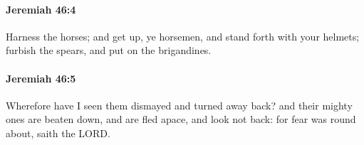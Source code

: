 		\paragraph{Jeremiah 46:4} %
			\label{JEREMIAH-46-4}

			Harness the horses; and get up, ye horsemen, and stand forth with your helmets; furbish the spears, and put on the brigandines.


		\paragraph{Jeremiah 46:5} %
			\label{JEREMIAH-46-5}

			Wherefore have I seen them dismayed and turned away back? and their mighty ones are beaten down, and are fled apace, and look not back: for fear was round about, saith the LORD.


